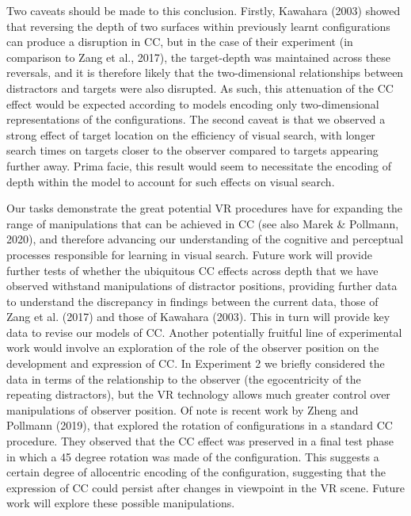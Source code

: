 \documentclass[
  man,floatsintext]{apa7}
\begin{document}
Two caveats should be made to this conclusion. Firstly, Kawahara (2003) showed that reversing the depth of two surfaces within previously learnt configurations can produce a disruption in CC, but in the case of their experiment (in comparison to Zang et al., 2017), the target-depth was maintained across these reversals, and it is therefore likely that the two-dimensional relationships between distractors and targets were also disrupted. As such, this attenuation of the CC effect would be expected according to models encoding only two-dimensional representations of the configurations. The second caveat is that we observed a strong effect of target location on the efficiency of visual search, with longer search times on targets closer to the observer compared to targets appearing further away. Prima facie, this result would seem to necessitate the encoding of depth within the model to account for such effects on visual search.

Our tasks demonstrate the great potential VR procedures have for expanding the range of manipulations that can be achieved in CC (see also Marek \& Pollmann, 2020), and therefore advancing our understanding of the cognitive and perceptual processes responsible for learning in visual search. Future work will provide further tests of whether the ubiquitous CC effects across depth that we have observed withstand manipulations of distractor positions, providing further data to understand the discrepancy in findings between the current data, those of Zang et al. (2017) and those of Kawahara (2003). This in turn will provide key data to revise our models of CC. Another potentially fruitful line of experimental work would involve an exploration of the role of the observer position on the development and expression of CC. In Experiment 2 we briefly considered the data in terms of the relationship to the observer (the egocentricity of the repeating distractors), but the VR technology allows much greater control over manipulations of observer position. Of note is recent work by Zheng and Pollmann (2019), that explored the rotation of configurations in a standard CC procedure. They observed that the CC effect was preserved in a final test phase in which a 45 degree rotation was made of the configuration. This suggests a certain degree of allocentric encoding of the configuration, suggesting that the expression of CC could persist after changes in viewpoint in the VR scene. Future work will explore these possible manipulations.

\newpage
\end{document}
